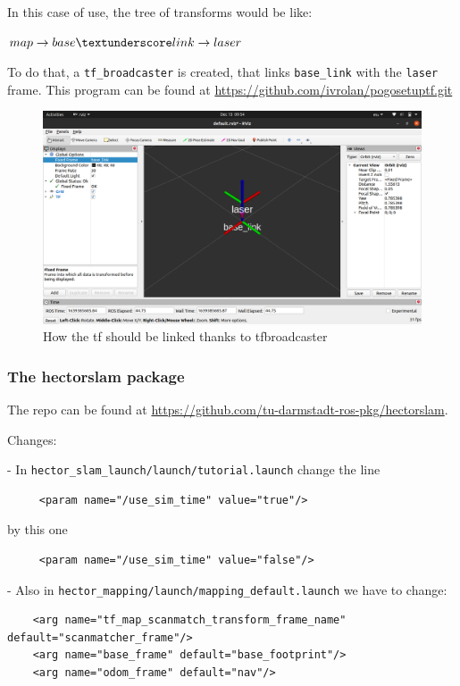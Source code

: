 \documentclass{article}
\begin{document}
 In this case of use,  the tree of transforms would be like:
 
 $ map \rightarrow base\textunderscore link \rightarrow laser $
 
 To do that, a \verb|tf_broadcaster| is created, that links \verb|base_link| with the \verb|laser| frame. This program can be found at  \href{https://github.com/ivrolan/pogo_setup_tf.git}{https://github.com/ivrolan/pogo\textunderscore setup\textunderscore tf.git}
 
 \begin{figure}[H]
    \centering
    \includegraphics[width=\linewidth]{tf.png}
    \caption{How the tf should be linked thanks to tf\textunderscore broadcaster}
    \label{fig:tf}
\end{figure}
 
 \subsubsection{The hector\textunderscore slam package}
 
 The repo can be found at \href{https://github.com/tu-darmstadt-ros-pkg/hector_slam}{https://github.com/tu-darmstadt-ros-pkg/hector\textunderscore slam}.
 
 Changes:
 
 - In \verb|hector_slam_launch/launch/tutorial.launch| change the line 
 \begin{verbatim}
     <param name="/use_sim_time" value="true"/>
 \end{verbatim}
 by this one
 \begin{verbatim}
     <param name="/use_sim_time" value="false"/>
 \end{verbatim}
 
 
- Also in \verb|hector_mapping/launch/mapping_default.launch| we have to change:
\begin{verbatim}
    <arg name="tf_map_scanmatch_transform_frame_name" default="scanmatcher_frame"/>
    <arg name="base_frame" default="base_footprint"/>
    <arg name="odom_frame" default="nav"/>
\end{verbatim}
\end{document}
